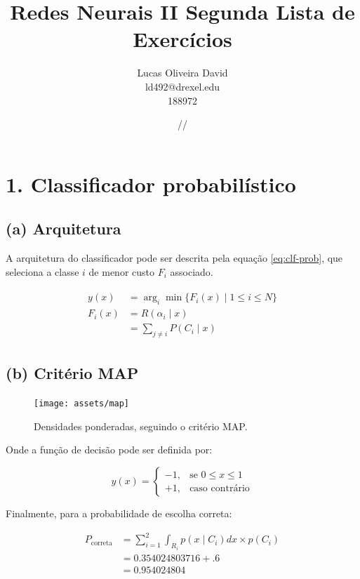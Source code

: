 \documentclass[12pt]{report}
\title{\textbf{Redes Neurais II Segunda Lista de Exercícios}}
\author{Lucas Oliveira David\\ld492@drexel.edu\\188972}
\date{\oldstylenums{24}/\oldstylenums{11}/\oldstylenums{2016}}
\begin{document}
\maketitle

\section{1. Classificador probabilístico}

\subsection{(a) Arquitetura}

A arquitetura do classificador pode ser descrita pela equação \ref{eq:clf-prob}, que seleciona a classe $i$ de menor custo $F_i$ associado.

\begin{align}
	\label{eq:clf-prob}
	\begin{split}
		y(x) &= \arg_i \min \{F_i(x) \mid 1 \le i \le N\}\\
		F_i(x) &= R(\alpha_i \mid x)\\
		&= \sum_{j \ne i} P(C_i \mid x)
	\end{split}
\end{align}

\subsection{(b) Critério MAP}

\begin{figure}[H]
	\centering
	\texttt{[image: assets/map]}
	\caption{Densidades ponderadas, seguindo o critério MAP.}
	\label{fig:map}
\end{figure}

Onde a função de decisão pode ser definida por:

\[
y(x)= 
\begin{cases}
-1, & \text{se } 0 \le x \le 1 \\
+1, & \text{caso contrário}
\end{cases}
\]

Finalmente, para a probabilidade de escolha correta:

\begin{align*}
	P_{\text{correta}} &= \sum_{i = 1}^2 \int_{R_i} p(x \mid C_i) dx \times p(C_i) \\
	&= 0.354024803716 + .6\\
	&= 0.954024804
\end{align*}
\end{document}
